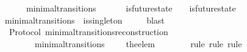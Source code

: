 \begin{isabellebody}
\ {\isacartoucheopen}{\isasymforall}{\isasymsigma}\ {\isasymsigma}{\isacharprime}{\isachardot}\ {\isacharparenleft}{\isasymsigma}{\isacharcomma}\ {\isasymsigma}{\isacharprime}{\isacharparenright}\ {\isasymin}\ minimal{\isacharunderscore}transitions\ {\isasymlongrightarrow}\ {\isacharparenleft}{\isasymnexists}{\isasymsigma}{\isacharprime}{\isacharprime}{\isachardot}\ {\isasymsigma}{\isacharprime}{\isacharprime}\ {\isasymin}\ {\isasymSigma}\ {\isasymand}\ is{\isacharunderscore}future{\isacharunderscore}state\ {\isacharparenleft}{\isasymsigma}{\isacharcomma}\ {\isasymsigma}{\isacharprime}{\isacharprime}{\isacharparenright}\ {\isasymand}\ is{\isacharunderscore}future{\isacharunderscore}state\ {\isacharparenleft}{\isasymsigma}{\isacharprime}{\isacharprime}{\isacharcomma}\ {\isasymsigma}{\isacharprime}{\isacharparenright}\ {\isasymand}\ {\isasymsigma}\ {\isasymnoteq}\ {\isasymsigma}{\isacharprime}{\isacharprime}\ {\isasymand}\ {\isasymsigma}{\isacharprime}{\isacharprime}\ {\isasymnoteq}\ {\isasymsigma}{\isacharprime}{\isacharparenright}{\isacartoucheclose}\ {\isacartoucheopen}{\isasymnot}\ {\isacharparenleft}{\isasymforall}{\isasymsigma}\ {\isasymsigma}{\isacharprime}{\isachardot}\ {\isacharparenleft}{\isasymsigma}{\isacharcomma}\ {\isasymsigma}{\isacharprime}{\isacharparenright}\ {\isasymin}\ minimal{\isacharunderscore}transitions\ {\isasymlongrightarrow}\ is{\isacharunderscore}singleton\ {\isacharparenleft}{\isasymsigma}{\isacharprime}\ {\isacharminus}\ {\isasymsigma}{\isacharparenright}{\isacharparenright}{\isacartoucheclose}\ \isamarkupfalse%
\ blast\isanewline
{}\isamarkupfalse%
%
\endisatagproof
{\isafoldproof}%
%
\isadelimproof
\isanewline
%
\endisadelimproof
\isanewline
{}\isamarkupfalse%
\ {\isacharparenleft}\ Protocol{\isacharparenright}\ minimal{\isacharunderscore}transitions{\isacharunderscore}reconstruction\ {\isacharcolon}\isanewline
\ \ {\isachardoublequoteopen}{\isasymforall}\ {\isasymsigma}\ {\isasymsigma}{\isacharprime}{\isachardot}\ {\isacharparenleft}{\isasymsigma}{\isacharcomma}\ {\isasymsigma}{\isacharprime}{\isacharparenright}\ {\isasymin}\ minimal{\isacharunderscore}transitions\ \ {\isasymlongrightarrow}\ {\isasymsigma}\ {\isasymunion}\ {\isacharbraceleft}the{\isacharunderscore}elem\ {\isacharparenleft}{\isasymsigma}{\isacharprime}{\isacharminus}\ {\isasymsigma}{\isacharparenright}{\isacharbraceright}\ {\isacharequal}\ {\isasymsigma}{\isacharprime}{\isachardoublequoteclose}\isanewline
%
\isadelimproof
\ \ %
\endisadelimproof
%
\isatagproof
{}\isamarkupfalse%
\ {\isacharparenleft}rule{\isacharcomma}\ rule{\isacharcomma}\ rule{\isacharparenright}\isanewline

\end{isabellebody}

